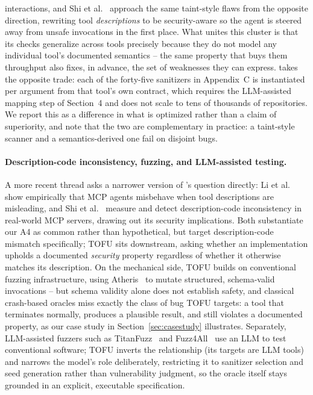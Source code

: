 interactions, and Shi et al.~\cite{spellsmith} approach the same taint-style flaws from the opposite direction, rewriting tool \emph{descriptions} to be security-aware so the agent is steered away from unsafe invocations in the first place. What unites this cluster is that its checks generalize across tools precisely because they do not model any individual tool's documented semantics -- the same property that buys them throughput also fixes, in advance, the set of weaknesses they can express. \project{} takes the opposite trade: each of the forty-five sanitizers in Appendix~C is instantiated per argument from that tool's own contract, which requires the LLM-assisted mapping step of Section~4 and does not scale to tens of thousands of repositories. We report this as a difference in what is optimized rather than a claim of superiority, and note that the two are complementary in practice: a taint-style scanner and a semantics-derived one fail on disjoint bugs.

\paragraph{Description-code inconsistency, fuzzing, and LLM-assisted testing.}
A more recent thread asks a narrower version of \project{}'s question directly: Li et al.~\cite{li2026don} show empirically that MCP agents misbehave when tool descriptions are misleading, and Shi et al.~\cite{shi2026description} measure and detect description-code inconsistency in real-world MCP servers, drawing out its security implications. Both substantiate our A4 as common rather than hypothetical, but target description-code mismatch specifically; TOFU sits downstream, asking whether an implementation upholds a documented \emph{security} property regardless of whether it otherwise matches its description. On the mechanical side, TOFU builds on conventional fuzzing infrastructure, using Atheris~\cite{atheris} to mutate structured, schema-valid invocations -- but schema validity alone does not establish safety, and classical crash-based oracles miss exactly the class of bug TOFU targets: a tool that terminates normally, produces a plausible result, and still violates a documented property, as our case study in Section~\ref{sec:casestudy} illustrates. Separately, LLM-assisted fuzzers such as TitanFuzz~\cite{deng2023large} and Fuzz4All~\cite{xia2024fuzz4all} use an LLM to test conventional software; TOFU inverts the relationship (its targets are LLM tools) and narrows the model's role deliberately, restricting it to sanitizer selection and seed generation rather than vulnerability judgment, so the oracle itself stays grounded in an explicit, executable specification.
